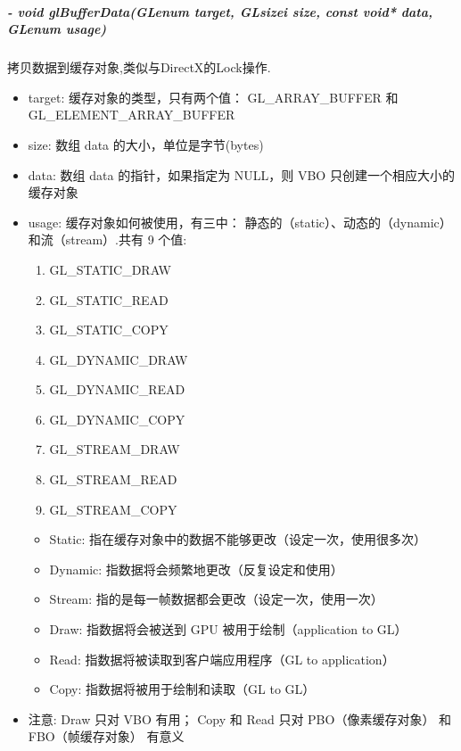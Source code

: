 \documentclass[UTF8,a4paper,12pt]{ctexbook}
\begin{document}
			\subparagraph{- void glBufferData(GLenum target, GLsizei size, const void* data, GLenum usage)}拷贝数据到缓存对象,类似与DirectX的Lock操作.
				\begin{itemize}
					\item target: 缓存对象的类型，只有两个值： GL\_ARRAY\_BUFFER 和 GL\_ELEMENT\_ARRAY\_BUFFER
					
					\item size: 数组 data 的大小，单位是字节(bytes)
					\item data: 数组 data 的指针，如果指定为 NULL，则 VBO 只创建一个相应大小的缓存对象
					\item usage: 缓存对象如何被使用，有三中： 静态的（static）、动态的（dynamic）和流（stream）.共有 9 个值:
						\begin{enumerate}
							\item GL\_STATIC\_DRAW
							\item GL\_STATIC\_READ
							\item GL\_STATIC\_COPY
							\item GL\_DYNAMIC\_DRAW
							\item GL\_DYNAMIC\_READ
							\item GL\_DYNAMIC\_COPY
							\item GL\_STREAM\_DRAW
							\item GL\_STREAM\_READ
							\item GL\_STREAM\_COPY
						\end{enumerate}
						
						\begin{itemize}
							\item Static: 指在缓存对象中的数据不能够更改（设定一次，使用很多次）
							\item Dynamic: 指数据将会频繁地更改（反复设定和使用）
							\item Stream: 指的是每一帧数据都会更改（设定一次，使用一次）
						\end{itemize}
						
						\begin{itemize}
							\item Draw: 指数据将会被送到 GPU 被用于绘制（application to GL）
							\item Read: 指数据将被读取到客户端应用程序（GL to application）
							\item Copy: 指数据将被用于绘制和读取（GL to GL）
						\end{itemize}
					\item 注意: Draw 只对 VBO 有用； Copy 和 Read 只对 PBO（像素缓存对象） 和 FBO（帧缓存对象） 有意义
				\end{itemize}
			
\end{document}
